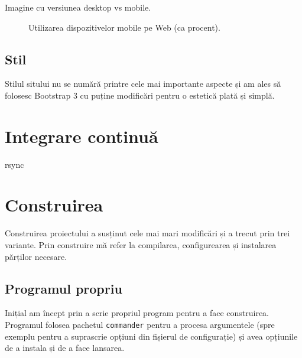 \documentclass[a4wide,12pt]{report}
\newcommand{\cod}[1]{\texttt{#1}}
\newcommand{\idee}[1]{{\color{red} #1}}
\begin{document}
\idee{Imagine cu versiunea desktop vs mobile.}

\begin{figure}[hb]
\begin{center}
\end{center}
\caption{Utilizarea dispozitivelor mobile pe Web (ca procent)\cite{statcount}.}
\label{mobilefig}
\end{figure}

\subsection{Stil}

Stilul sitului nu se numără printre cele mai importante aspecte și am ales să
folosesc Bootstrap 3 cu puține modificări pentru o estetică plată și simplă.

\section{Integrare continuă}

\idee{rsync}

\section{Construirea}

Construirea proiectului a susținut cele mai mari modificări și a trecut prin
trei variante. Prin construire mă refer la compilarea, configurearea și
instalarea părților necesare.

\subsection{Programul propriu}

Inițial am încept prin a scrie propriul program pentru a face construirea.
Programul folosea pachetul \cod{commander} pentru a procesa argumentele (spre
exemplu pentru a suprascrie opțiuni din fișierul de configurație) și avea
opțiunile de a instala și de a face lansarea.
\end{document}

